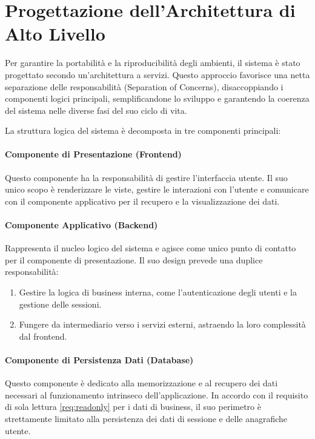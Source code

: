 \documentclass[12pt,a4paper,openright,twoside]{book}
\begin{document}
\section{Progettazione dell'Architettura di Alto Livello}
\label{sec:design_architettura}

Per garantire la portabilità e la riproducibilità degli ambienti, il sistema è stato progettato secondo un'architettura a servizi. Questo approccio favorisce una netta separazione delle responsabilità (Separation of Concerns), disaccoppiando i componenti logici principali, semplificandone lo sviluppo e garantendo la coerenza del sistema nelle diverse fasi del suo ciclo di vita.

La struttura logica del sistema è decomposta in tre componenti principali:


\paragraph{Componente di Presentazione (Frontend)} Questo componente ha la responsabilità di gestire l'interfaccia utente. Il suo unico scopo è renderizzare le viste, gestire le interazioni con l'utente e comunicare con il componente applicativo per il recupero e la visualizzazione dei dati.

\paragraph{Componente Applicativo (Backend)} Rappresenta il nucleo logico del sistema e agisce come unico punto di contatto per il componente di presentazione. Il suo design prevede una duplice responsabilità:
\begin{enumerate}
    \item Gestire la logica di business interna, come l'autenticazione degli utenti e la gestione delle sessioni.
    \item Fungere da intermediario verso i servizi esterni, astraendo la loro complessità dal frontend.
\end{enumerate}

\paragraph{Componente di Persistenza Dati (Database)} Questo componente è dedicato alla memorizzazione e al recupero dei dati necessari al funzionamento intrinseco dell'applicazione. In accordo con il requisito di sola lettura \ref{req:readonly} per i dati di business, il suo perimetro è strettamente limitato alla persistenza dei dati di sessione e delle anagrafiche utente.
\end{document}
